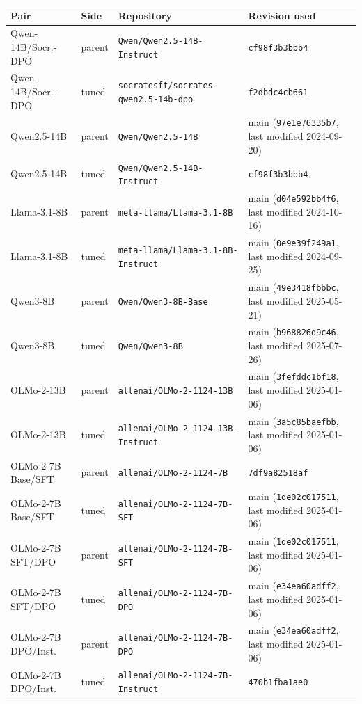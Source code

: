 \begin{table}[t]
\centering\scriptsize
\setlength{\tabcolsep}{4pt}
\begin{tabular}{@{}llll@{}}
\toprule
Pair & Side & Repository & Revision used \\
\midrule
Qwen-14B/Socr.-DPO & parent & \texttt{Qwen/Qwen2.5-14B-Instruct} & \texttt{cf98f3b3bbb4} \\
Qwen-14B/Socr.-DPO & tuned & \texttt{socratesft/socrates-qwen2.5-14b-dpo} & \texttt{f2dbdc4cb661} \\
Qwen2.5-14B & parent & \texttt{Qwen/Qwen2.5-14B} & main (\texttt{97e1e76335b7}, last modified 2024-09-20) \\
Qwen2.5-14B & tuned & \texttt{Qwen/Qwen2.5-14B-Instruct} & \texttt{cf98f3b3bbb4} \\
Llama-3.1-8B & parent & \texttt{meta-llama/Llama-3.1-8B} & main (\texttt{d04e592bb4f6}, last modified 2024-10-16) \\
Llama-3.1-8B & tuned & \texttt{meta-llama/Llama-3.1-8B-Instruct} & main (\texttt{0e9e39f249a1}, last modified 2024-09-25) \\
Qwen3-8B & parent & \texttt{Qwen/Qwen3-8B-Base} & main (\texttt{49e3418fbbbc}, last modified 2025-05-21) \\
Qwen3-8B & tuned & \texttt{Qwen/Qwen3-8B} & main (\texttt{b968826d9c46}, last modified 2025-07-26) \\
OLMo-2-13B & parent & \texttt{allenai/OLMo-2-1124-13B} & main (\texttt{3fefddc1bf18}, last modified 2025-01-06) \\
OLMo-2-13B & tuned & \texttt{allenai/OLMo-2-1124-13B-Instruct} & main (\texttt{3a5c85baefbb}, last modified 2025-01-06) \\
OLMo-2-7B Base/SFT & parent & \texttt{allenai/OLMo-2-1124-7B} & \texttt{7df9a82518af} \\
OLMo-2-7B Base/SFT & tuned & \texttt{allenai/OLMo-2-1124-7B-SFT} & main (\texttt{1de02c017511}, last modified 2025-01-06) \\
OLMo-2-7B SFT/DPO & parent & \texttt{allenai/OLMo-2-1124-7B-SFT} & main (\texttt{1de02c017511}, last modified 2025-01-06) \\
OLMo-2-7B SFT/DPO & tuned & \texttt{allenai/OLMo-2-1124-7B-DPO} & main (\texttt{e34ea60adff2}, last modified 2025-01-06) \\
OLMo-2-7B DPO/Inst. & parent & \texttt{allenai/OLMo-2-1124-7B-DPO} & main (\texttt{e34ea60adff2}, last modified 2025-01-06) \\
OLMo-2-7B DPO/Inst. & tuned & \texttt{allenai/OLMo-2-1124-7B-Instruct} & \texttt{470b1fba1ae0} \\

\end{tabular}
\end{table}
